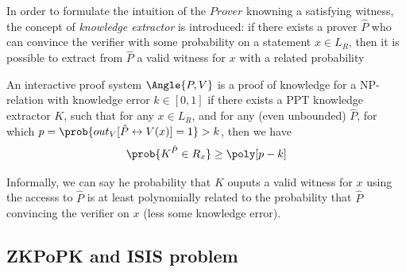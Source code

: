 In order to formulate the intuition of the $Prover$ knowning a satisfying witness, the concept of \textit{knowledge extractor} is introduced: if there exists a prover $\hat{P}$ who can convince the verifier with some probability on a statement $x \in L_{R}$, then it is possible to extract from $\hat{P}$ a valid witness for $x$ with a related probability

\begin{definition}
  An interactive proof system $\Angle{P,V}$ is a proof of knowledge for a
  NP-relation with knowledge error $k \in [0,1]$ if there exists a PPT knowledge
  extractor $K$, such that for any $x \in L_{R}$, and for any (even unbounded)
  $\hat{P}$, for which $p = \prob{out_{V}[\hat{P}\leftrightarrow V(x)] = 1} > k$,
  then we have
  \[
\prob{K^{\hat{P}} \in R_{x}} \geq \poly[p - k]
  \]
\end{definition}

Informally, we can say he probability that $K$ ouputs a valid witness for $x$ using the accesss to $\hat{P}$ is at least polynomially related to the probability that $\hat{P}$ convincing the verifier on $x$ (less some knowledge error).

\subsection{ZKPoPK and ISIS problem}
\label{sec:zkpIsisi}


